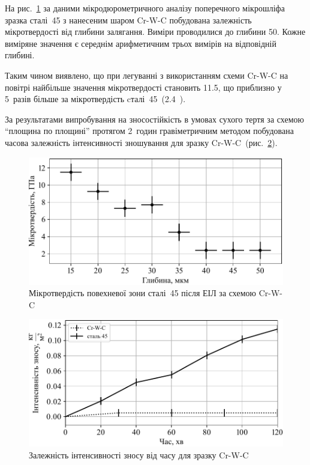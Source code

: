 \documentclass[a4paper,fontsize=14bp,ukrainian]{extreport}
\begin{document}
На рис.~\ref{fig:plt_hard_Cr-W-C} за даними мікродюрометричного аналізу поперечного мікрошліфа зразка сталі~45 з нанесеним шаром Cr-W-C побудована залежність мікротвердості від глибини залягання. Виміри проводилися до глибини \SI{50}{\mkm}. Кожне виміряне значення є середнім арифметичним трьох вимірів на відповідній глибині.

Таким чином виявлено, що при легуванні з використанням схеми Cr-W-C на повітрі найбільше значення мікротвердості становить \SI{11.5}{\gpa}, що приблизно у 5~разів більше за мікротвердість cталі~45~(\SI{2.4}{\gpa}~\cite{steel45}).

За результатами випробування на зносостійкість в умовах сухого тертя за схемою ``площина по площині'' протягом 2~годин гравіметричним методом побудована часова залежність інтенсивності зношування для зразку Cr-W-C~(рис.~\ref{fig:plt_wear_Cr-W-C}).

\begin{figure}[H]
\centering
\includegraphics[]{plt_hard_Cr-W-C.pdf}
\caption{Мікротвердість повехневої зони сталі~45 після ЕІЛ за схемою Cr-W-C}
\label{fig:plt_hard_Cr-W-C}
\end{figure}

\begin{figure}[H]
\centering
\includegraphics[]{plt_wear_Cr-W-C.pdf}
\caption{Залежність інтенсивності зносу від часу для зразку Cr-W-C}
\label{fig:plt_wear_Cr-W-C}
\end{figure}
\end{document}
